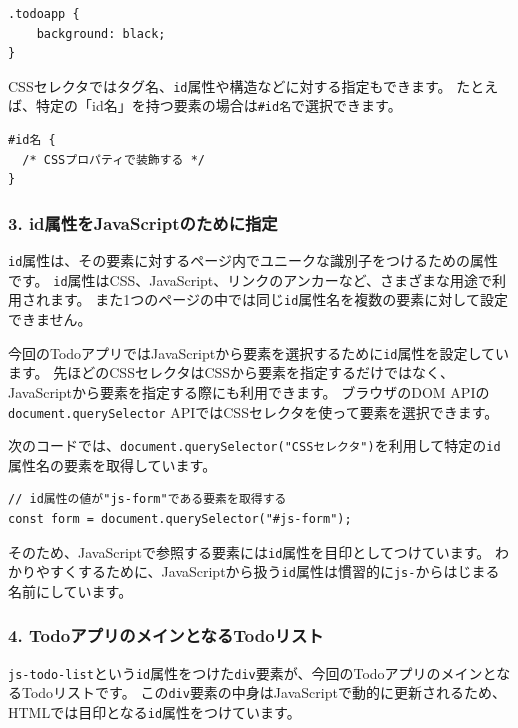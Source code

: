 \begin{lstlisting}
.todoapp {
    background: black;
}
\end{lstlisting}

CSSセレクタではタグ名、\texttt{id}属性や構造などに対する指定もできます。
たとえば、特定の「id名」を持つ要素の場合は\texttt{\#id名}で選択できます。

\begin{lstlisting}
#id名 {
  /* CSSプロパティで装飾する */
}
\end{lstlisting}

\hypertarget{comment-id-for-js}{%
\subsubsection{3. id属性をJavaScriptのために指定}\label{comment-id-for-js}}

\texttt{id}属性は、その要素に対するページ内でユニークな識別子をつけるための属性です。
\texttt{id}属性はCSS、JavaScript、リンクのアンカーなど、さまざまな用途で利用されます。
また1つのページの中では同じ\texttt{id}属性名を複数の要素に対して設定できません。

今回のTodoアプリではJavaScriptから要素を選択するために\texttt{id}属性を設定しています。
先ほどのCSSセレクタはCSSから要素を指定するだけではなく、JavaScriptから要素を指定する際にも利用できます。
ブラウザのDOM APIの\texttt{document.querySelector}
APIではCSSセレクタを使って要素を選択できます。

次のコードでは、\texttt{document.querySelector("CSSセレクタ")}を利用して特定の\texttt{id}属性名の要素を取得しています。

\begin{lstlisting}
// id属性の値が"js-form"である要素を取得する
const form = document.querySelector("#js-form");
\end{lstlisting}

そのため、JavaScriptで参照する要素には\texttt{id}属性を目印としてつけています。
わかりやすくするために、JavaScriptから扱う\texttt{id}属性は慣習的に\texttt{js-}からはじまる名前にしています。

\hypertarget{comment-todo-list}{%
\subsubsection{4. TodoアプリのメインとなるTodoリスト}\label{comment-todo-list}}

\texttt{js-todo-list}という\texttt{id}属性をつけた\texttt{div}要素が、今回のTodoアプリのメインとなるTodoリストです。
この\texttt{div}要素の中身はJavaScriptで動的に更新されるため、HTMLでは目印となる\texttt{id}属性をつけています。

